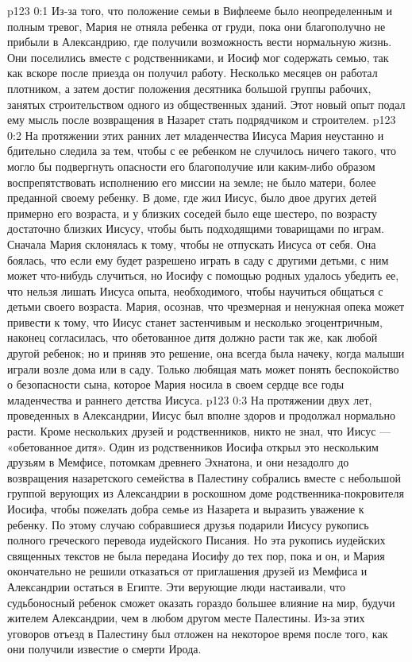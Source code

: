 \author{Комиссия срединников}
\vs p123 0:1 Из\hyp{}за того, что положение семьи в Вифлееме было неопределенным и полным тревог, Мария не отняла ребенка от груди, пока они благополучно не прибыли в Александрию, где получили возможность вести нормальную жизнь. Они поселились вместе с родственниками, и Иосиф мог содержать семью, так как вскоре после приезда он получил работу. Несколько месяцев он работал плотником, а затем достиг положения десятника большой группы рабочих, занятых строительством одного из общественных зданий. Этот новый опыт подал ему мысль после возвращения в Назарет стать подрядчиком и строителем.
\vs p123 0:2 \pc На протяжении этих ранних лет младенчества Иисуса Мария неустанно и бдительно следила за тем, чтобы с ее ребенком не случилось ничего такого, что могло бы подвергнуть опасности его благополучие или каким\hyp{}либо образом воспрепятствовать исполнению его миссии на земле; не было матери, более преданной своему ребенку. В доме, где жил Иисус, было двое других детей примерно его возраста, и у близких соседей было еще шестеро, по возрасту достаточно близких Иисусу, чтобы быть подходящими товарищами по играм. Сначала Мария склонялась к тому, чтобы не отпускать Иисуса от себя. Она боялась, что если ему будет разрешено играть в саду с другими детьми, с ним может что\hyp{}нибудь случиться, но Иосифу с помощью родных удалось убедить ее, что нельзя лишать Иисуса опыта, необходимого, чтобы научиться общаться с детьми своего возраста. Мария, осознав, что чрезмерная и ненужная опека может привести к тому, что Иисус станет застенчивым и несколько эгоцентричным, наконец согласилась, что обетованное дитя должно расти так же, как любой другой ребенок; но и приняв это решение, она всегда была начеку, когда малыши играли возле дома или в саду. Только любящая мать может понять беспокойство о безопасности сына, которое Мария носила в своем сердце все годы младенчества и раннего детства Иисуса.
\vs p123 0:3 На протяжении двух лет, проведенных в Александрии, Иисус был вполне здоров и продолжал нормально расти. Кроме нескольких друзей и родственников, никто не знал, что Иисус --- «обетованное дитя». Один из родственников Иосифа открыл это нескольким друзьям в Мемфисе, потомкам древнего Эхнатона, и они незадолго до возвращения назаретского семейства в Палестину собрались вместе с небольшой группой верующих из Александрии в роскошном доме родственника\hyp{}покровителя Иосифа, чтобы пожелать добра семье из Назарета и выразить уважение к ребенку. По этому случаю собравшиеся друзья подарили Иисусу рукопись полного греческого перевода иудейского Писания. Но эта рукопись иудейских священных текстов не была передана Иосифу до тех пор, пока и он, и Мария окончательно не решили отказаться от приглашения друзей из Мемфиса и Александрии остаться в Египте. Эти верующие люди настаивали, что судьбоносный ребенок сможет оказать гораздо большее влияние на мир, будучи жителем Александрии, чем в любом другом месте Палестины. Из\hyp{}за этих уговоров отъезд в Палестину был отложен на некоторое время после того, как они получили известие о смерти Ирода.
